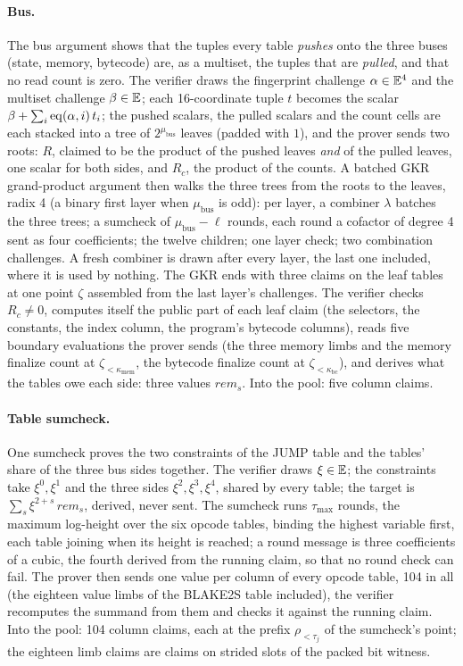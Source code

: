 \paragraph{Bus.} The bus argument shows that the tuples every table \emph{pushes} onto the
three buses (state, memory, bytecode) are, as a multiset, the tuples that are \emph{pulled},
and that no read count is zero. The verifier draws the fingerprint challenge
$\alpha \in \mathbb{E}^4$ and the multiset challenge $\beta \in \mathbb{E}$; each 16-coordinate tuple $t$
becomes the scalar $\beta + \sum_i \mathrm{eq}(\alpha, i)\, t_i$; the pushed scalars, the pulled scalars
and the count cells are each stacked into a tree of $2^{\mu_{\mathrm{bus}}}$ leaves (padded
with $1$), and the prover sends two roots: $R$, claimed to be the product of the pushed leaves
\emph{and} of the pulled leaves, one scalar for both sides, and $R_c$, the product of the
counts. A batched GKR grand-product argument then walks the three trees from the roots to the
leaves, radix 4 (a binary first layer when $\mu_{\mathrm{bus}}$ is odd): per layer, a
combiner $\lambda$ batches the three trees; a sumcheck of $\mu_{\mathrm{bus}} - \ell$ rounds,
each round a cofactor of degree 4 sent as four coefficients; the twelve children; one layer
check; two combination challenges. A fresh combiner is drawn after every layer, the last one
included, where it is used by nothing. The GKR ends with three claims on the leaf tables at one
point $\zeta$ assembled from the last layer's challenges. The verifier checks $R_c \neq 0$,
computes itself the public part of each leaf claim (the selectors, the constants, the index
column, the program's bytecode columns), reads five boundary evaluations the prover sends (the
three memory limbs and the memory finalize count at $\zeta_{< \kappa_{\mathrm{mem}}}$, the
bytecode finalize count at $\zeta_{< \kappa_{\mathrm{bc}}}$), and derives what the tables owe
each side: three values $\mathit{rem}_s$. Into the pool: five column claims.

\paragraph{Table sumcheck.} One sumcheck proves the two constraints of the JUMP table and the
tables' share of the three bus sides together. The verifier draws $\xi \in \mathbb{E}$; the constraints
take $\xi^0, \xi^1$ and the three sides $\xi^2, \xi^3, \xi^4$, shared by every table; the
target is $\sum_s \xi^{2+s}\, \mathit{rem}_s$, derived, never sent. The sumcheck runs
$\tau_{\max}$ rounds, the maximum log-height over the six opcode tables, binding the highest
variable first, each table joining when its height is reached; a round message is three
coefficients of a cubic, the fourth derived from the running claim, so that no round check can
fail. The prover then sends one value per column of every opcode table, 104 in all (the
eighteen value limbs of the BLAKE2S table included), the verifier recomputes the summand from
them and checks it against the running claim. Into the pool: 104 column claims, each at the
prefix $\rho_{< \tau_j}$ of the sumcheck's point; the eighteen limb claims are claims on
strided slots of the packed bit witness.

